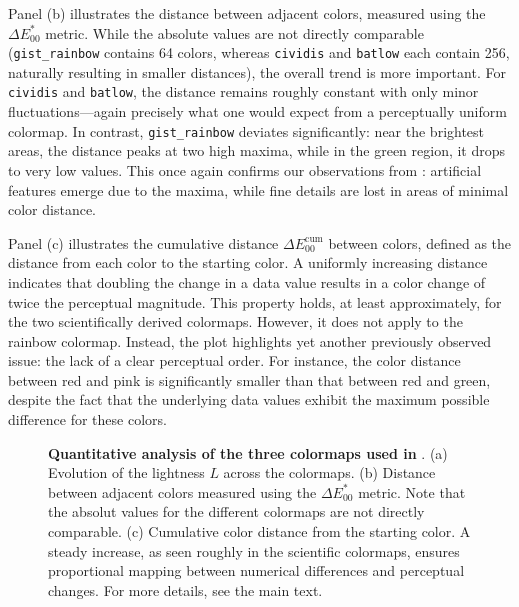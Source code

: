 Panel (b) illustrates the distance between adjacent colors, measured using the $\Delta E^*_{00}$ metric. While the absolute values are not directly comparable (\verb|gist_rainbow| contains 64 colors, whereas \verb|cividis| and \verb|batlow| each contain 256, naturally resulting in smaller distances), the overall trend is more important. For \verb|cividis| and \verb|batlow|, the distance remains roughly constant with only minor fluctuations---again precisely what one would expect from a perceptually uniform colormap. In contrast, \verb|gist_rainbow| deviates significantly: near the brightest areas, the distance peaks at two high maxima, while in the green region, it drops to very low values. This once again confirms our observations from : artificial features emerge due to the maxima, while fine details are lost in areas of minimal color distance.

Panel (c) illustrates the cumulative distance $\Delta E_{00}^{\text{cum}}$ between colors, defined as the distance from each color to the starting color. A uniformly increasing distance indicates that doubling the change in a data value results in a color change of twice the perceptual magnitude. This property holds, at least approximately, for the two scientifically derived colormaps. However, it does not apply to the rainbow colormap. Instead, the plot highlights yet another previously observed issue: the lack of a clear perceptual order. For instance, the color distance between red and pink is significantly smaller than that between red and green, despite the fact that the underlying data values exhibit the maximum possible difference for these colors.

\begin{figure}
	\centering
	
	\caption{\textbf{Quantitative analysis of the three colormaps used in }. (a) Evolution of the lightness $L$ across the colormaps. (b) Distance between adjacent colors measured using the $\Delta E^*_{00}$ metric. Note that the absolut values for the different colormaps are not directly comparable. (c) Cumulative color distance from the starting color. A steady increase, as seen roughly in the scientific colormaps, ensures proportional mapping between numerical differences and perceptual changes. For more details, see the main text.}
	\label{fig:cmapanalytics}
\end{figure}



